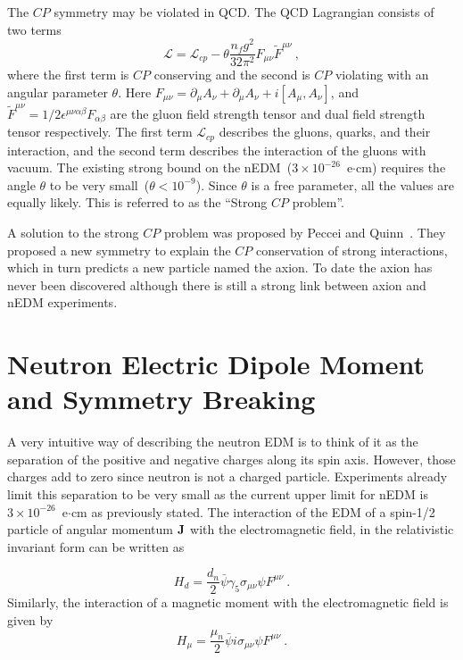 The $CP$ symmetry may be violated in QCD. The QCD Lagrangian consists
of two terms
\begin{equation}
  \label{eqn:qcd}
\mathscr{L}= \mathscr{L}_{cp} - \theta \frac{n_f g^2}{32 \pi^2} F_{\mu \nu} \tilde{F}^{\mu \nu}~,
\end{equation}
where the first term is $CP$ conserving and the second is $CP$
violating with an angular parameter $\theta$. Here
$F_{\mu \nu} = \partial_\mu A_\nu + \partial_\mu A_\nu +
i[A_\mu,A_\nu]$, and
$\tilde{F}^{\mu \nu}=1/2 \epsilon^{\mu \nu \alpha \beta}F_{\alpha
  \beta}$ are the gluon field strength tensor and dual field strength
tensor respectively. The first term $\mathscr{L}_{cp}$ describes the
gluons, quarks, and their interaction, and the second term describes
the interaction of the gluons with vacuum. The existing strong bound
on the nEDM~($3 \times 10^{-26}$~e$\cdot$cm) requires the angle
$\theta$ to be very small~($\theta < 10^{-9}$). Since $\theta$ is a
free parameter, all the values are equally likely. This is referred to
as the ``Strong $CP$ problem''.

A solution to the strong $CP$ problem was proposed by Peccei and
Quinn~\cite{Peccei1977}. They proposed a new symmetry to explain the
$CP$ conservation of strong interactions, which in turn predicts a new
particle named the axion. To date the axion has never been discovered
although there is still a strong link between axion and nEDM
experiments.

\section{Neutron Electric Dipole Moment and Symmetry Breaking}

A very intuitive way of describing the neutron EDM is to think of it
as the separation of the positive and negative charges along its spin
axis. However, those charges add to zero since neutron is not a
charged particle. Experiments already limit this separation to be very
small as the current upper limit for nEDM is
$3 \times 10^{-26}$~e$\cdot$cm as previously stated. The interaction
of the EDM of a spin-1/2 particle of angular momentum $\bf{J}$ with
the electromagnetic field, in the relativistic invariant form can be
written as

\begin{equation}
\label{eqn:hamiltonianRELelectric}
H_d = \frac{d_n}{2} \bar{\psi} \gamma_5 \sigma_{\mu \nu} \psi F^{\mu \nu}~.
\end{equation}
Similarly, the interaction of a magnetic moment with the
electromagnetic field is given by
\begin{equation}
\label{eqn:hamiltonianRELmagnetic}
  H_\mu = \frac{\mu_n}{2} \bar{\psi} i \sigma_{\mu \nu} \psi F^{\mu \nu}~.
\end{equation}

